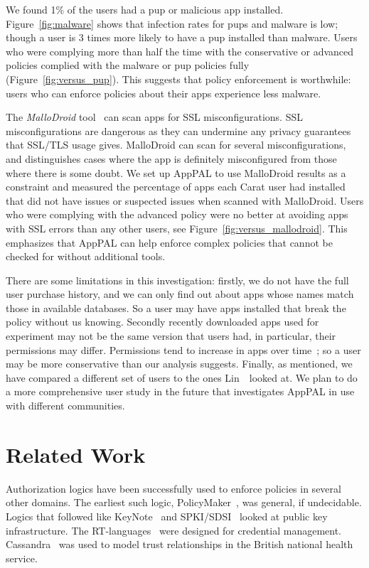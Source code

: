 \documentclass[]{llncs}
\newcommand{\citep}[1]{\cite{#1}}
\begin{document}
We found 1\% of the users had a \ac{pup} or malicious app installed.
Figure~\ref{fig:malware} shows that infection rates for \ac{pup}s and malware is low;
though a user is 3 times more likely to have a \ac{pup} installed than malware.
Users who were complying more than half the time with the conservative or advanced policies complied with the malware or \ac{pup} policies fully (Figure~\autoref{fig:versus_pup}).
This suggests that policy enforcement is worthwhile: users who can enforce policies about their apps experience less malware.

The \emph{MalloDroid} tool~\citep{Fahl:2012dj} can scan apps for SSL misconfigurations.
SSL misconfigurations are dangerous as they can undermine any privacy guarantees that SSL/TLS usage gives.
MalloDroid can scan for several misconfigurations, and distinguishes cases where the app is definitely misconfigured from those where there is some doubt.
We set up AppPAL to use MalloDroid results as a constraint and measured the percentage of apps each Carat user had installed that did not have issues or suspected issues when scanned with MalloDroid.
Users who were complying with the advanced policy were no better at avoiding apps with SSL errors than any other users, see Figure~\autoref{fig:versus_mallodroid}.
This emphasizes that AppPAL can help enforce complex policies that cannot be checked for without additional tools.

There are some limitations in this investigation: 
firstly, we do not have the full user purchase history, and we can only find out about apps whose names match those in available databases.
So a user may have apps installed that break the policy without us knowing.
Secondly recently downloaded apps used for experiment may not be the same version that users had, in particular, their permissions may differ.
Permissions tend to increase in apps over time~\cite{Wei:2012id}; so a user may be more conservative than our analysis suggests.
Finally, as mentioned, we have compared a different set of users to the ones Lin~\etal~looked at.
We plan to do a more comprehensive user study in the future that investigates AppPAL in use with different communities.

\section{Related Work}

Authorization logics have been successfully used to enforce policies in several other domains.
The earliest such logic, PolicyMaker~\cite{Blaze:dj}, was general, if undecidable.
Logics that followed like KeyNote~\cite{Blaze:1999fa} and SPKI/SDSI~\cite{Ellison:1999ui} looked at public key infrastructure.
The RT-languages~\cite{Li:2002if} were designed for credential management.
Cassandra~\cite{Becker:2004fi} was used to model trust relationships in the British national health service.
\end{document}
